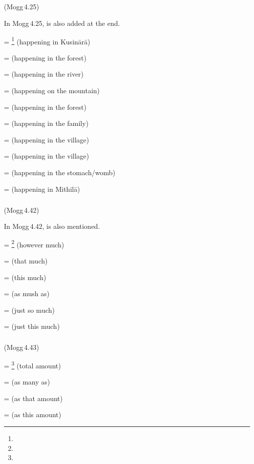 \subparagraph*{} (Mogg\,4.25)\label{pacct2:kadna}\label{pacct2:neyya}\label{pacct2:neyyaka}\label{pacct2:ya}\label{pacct2:iya}\label{pacct2:eyyaka}

In Mogg\,4.25,  is also added at the end.

 = \footnote{} (happening in Kusin\=ar\=a) \par
{} =  (happening in the forest) \par
{} =  (happening in the river) \par
{} =  (happening on the mountain) \par
{} =  (happening in the forest) \par
{} =  (happening in the family) \par
{} =  (happening in the village) \par
{} =  (happening in the village) \par
{} =  (happening in the stomach/womb) \par
{} =  (happening in Mithil\=a) \par

\subparagraph*{} (Mogg\,4.42)\label{pacct2:ttaka}

In Mogg\,4.42,  is also mentioned.

 = \footnote{} (however much) \par
{} =  (that much) \par
{} =  (this much) \par
{} =  (as mush as) \par
{} =  (just so much) \par
{} =  (just this much) \par

\subparagraph*{} (Mogg\,4.43)\label{pacct2:aavantu}

 = \footnote{} (total amount) \par
{} =  (as many as) \par
{} =  (as that amount) \par
{} =  (as this amount) \par

